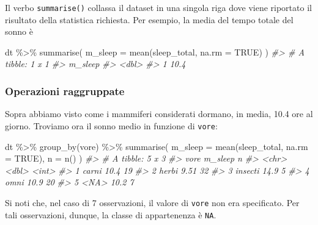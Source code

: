 \documentclass[
  10pt,
  italian,
  a4paper,
  extrafontsizes,onecolumn,openright
  ]{memoir}
\newenvironment{Shaded}{\begin{snugshade}}{\end{snugshade}}
\newcommand{\AttributeTok}[1]{\textcolor[rgb]{0.77,0.63,0.00}{#1}}
\newcommand{\CommentTok}[1]{\textcolor[rgb]{0.56,0.35,0.01}{\textit{#1}}}
\newcommand{\ConstantTok}[1]{\textcolor[rgb]{0.00,0.00,0.00}{#1}}
\newcommand{\FunctionTok}[1]{\textcolor[rgb]{0.00,0.00,0.00}{#1}}
\newcommand{\NormalTok}[1]{#1}
\newcommand{\SpecialCharTok}[1]{\textcolor[rgb]{0.00,0.00,0.00}{#1}}
\begin{document}
Il verbo \texttt{summarise()} collassa il dataset in una singola riga dove viene riportato il risultato della statistica richiesta. Per esempio, la media del tempo totale del sonno è

\begin{Shaded}
\begin{Highlighting}[]
\NormalTok{dt }\SpecialCharTok{\%\textgreater{}\%} 
  \FunctionTok{summarise}\NormalTok{(}
    \AttributeTok{m\_sleep =} \FunctionTok{mean}\NormalTok{(sleep\_total, }\AttributeTok{na.rm =} \ConstantTok{TRUE}\NormalTok{)}
\NormalTok{  ) }
\CommentTok{\#\textgreater{} \# A tibble: 1 x 1}
\CommentTok{\#\textgreater{}   m\_sleep}
\CommentTok{\#\textgreater{}     \textless{}dbl\textgreater{}}
\CommentTok{\#\textgreater{} 1    10.4}
\end{Highlighting}
\end{Shaded}

\hypertarget{operazioni-raggruppate}{%
\subsubsection{Operazioni raggruppate}\label{operazioni-raggruppate}}

Sopra abbiamo visto come i mammiferi considerati dormano, in media, 10.4 ore al giorno. Troviamo ora il sonno medio in funzione di \texttt{vore}:

\begin{Shaded}
\begin{Highlighting}[]
\NormalTok{dt }\SpecialCharTok{\%\textgreater{}\%}
  \FunctionTok{group\_by}\NormalTok{(vore) }\SpecialCharTok{\%\textgreater{}\%}
  \FunctionTok{summarise}\NormalTok{(}
    \AttributeTok{m\_sleep =} \FunctionTok{mean}\NormalTok{(sleep\_total, }\AttributeTok{na.rm =} \ConstantTok{TRUE}\NormalTok{), }
    \AttributeTok{n =} \FunctionTok{n}\NormalTok{()}
\NormalTok{  )}
\CommentTok{\#\textgreater{} \# A tibble: 5 x 3}
\CommentTok{\#\textgreater{}   vore    m\_sleep     n}
\CommentTok{\#\textgreater{}   \textless{}chr\textgreater{}     \textless{}dbl\textgreater{} \textless{}int\textgreater{}}
\CommentTok{\#\textgreater{} 1 carni     10.4     19}
\CommentTok{\#\textgreater{} 2 herbi      9.51    32}
\CommentTok{\#\textgreater{} 3 insecti   14.9      5}
\CommentTok{\#\textgreater{} 4 omni      10.9     20}
\CommentTok{\#\textgreater{} 5 \textless{}NA\textgreater{}      10.2      7}
\end{Highlighting}
\end{Shaded}

\noindent
Si noti che, nel caso di 7 osservazioni, il valore di \texttt{vore} non era
specificato. Per tali osservazioni, dunque, la classe di appartenenza è
\texttt{NA}.
\end{document}
